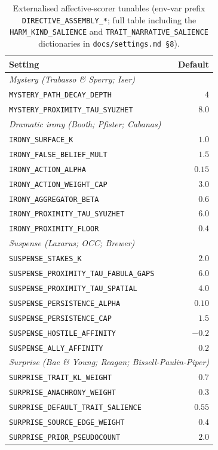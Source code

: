 \documentclass[11pt]{article}
\begin{document}
\begin{table}[h]
\centering
\small
\begin{tabular}{lr}
\toprule
Setting & Default \\
\midrule
\multicolumn{2}{l}{\emph{Mystery (Trabasso \& Sperry; Iser)}} \\
\texttt{MYSTERY\_PATH\_DECAY\_DEPTH} & $4$ \\
\texttt{MYSTERY\_PROXIMITY\_TAU\_SYUZHET} & $8.0$ \\
\midrule
\multicolumn{2}{l}{\emph{Dramatic irony (Booth; Pfister; Cabanas)}} \\
\texttt{IRONY\_SURFACE\_K} & $1.0$ \\
\texttt{IRONY\_FALSE\_BELIEF\_MULT} & $1.5$ \\
\texttt{IRONY\_ACTION\_ALPHA} & $0.15$ \\
\texttt{IRONY\_ACTION\_WEIGHT\_CAP} & $3.0$ \\
\texttt{IRONY\_AGGREGATOR\_BETA} & $0.6$ \\
\texttt{IRONY\_PROXIMITY\_TAU\_SYUZHET} & $6.0$ \\
\texttt{IRONY\_PROXIMITY\_FLOOR} & $0.4$ \\
\midrule
\multicolumn{2}{l}{\emph{Suspense (Lazarus; OCC; Brewer)}} \\
\texttt{SUSPENSE\_STAKES\_K} & $2.0$ \\
\texttt{SUSPENSE\_PROXIMITY\_TAU\_FABULA\_GAPS} & $6.0$ \\
\texttt{SUSPENSE\_PROXIMITY\_TAU\_SPATIAL} & $4.0$ \\
\texttt{SUSPENSE\_PERSISTENCE\_ALPHA} & $0.10$ \\
\texttt{SUSPENSE\_PERSISTENCE\_CAP} & $1.5$ \\
\texttt{SUSPENSE\_HOSTILE\_AFFINITY} & $-0.2$ \\
\texttt{SUSPENSE\_ALLY\_AFFINITY} & $0.2$ \\
\midrule
\multicolumn{2}{l}{\emph{Surprise (Bae \& Young; Reagan; Bissell-Paulin-Piper)}} \\
\texttt{SURPRISE\_TRAIT\_KL\_WEIGHT} & $0.7$ \\
\texttt{SURPRISE\_ANACHRONY\_WEIGHT} & $0.3$ \\
\texttt{SURPRISE\_DEFAULT\_TRAIT\_SALIENCE} & $0.55$ \\
\texttt{SURPRISE\_SOURCE\_EDGE\_WEIGHT} & $0.4$ \\
\texttt{SURPRISE\_PRIOR\_PSEUDOCOUNT} & $2.0$ \\
\bottomrule
\end{tabular}
\caption{Externalised affective-scorer tunables (env-var prefix
\texttt{DIRECTIVE\_ASSEMBLY\_*}; full table including the
\texttt{HARM\_KIND\_SALIENCE} and \texttt{TRAIT\_NARRATIVE\_SALIENCE}
dictionaries in \texttt{docs/settings.md~\S 8}).}
\label{tab:scorer-tunables}
\end{table}
\end{document}
